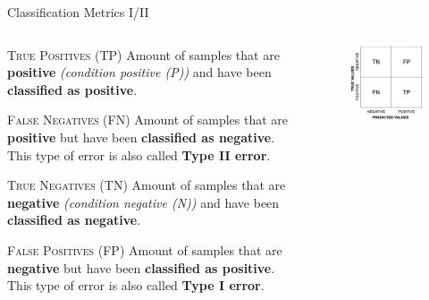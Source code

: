 \documentclass[document.tex]{subfiles}
\begin{document}
    \begin{frame}{Classification Metrics I/II}
        \begin{columns}
            \begin{column}{0.6\textwidth}
                \begin{alertblock}{\textsc{True Positives (TP)}}
                    Amount of samples that are \textbf{positive} \textit{(condition positive (P))} and have been \textbf{classified as positive}.
                \end{alertblock}
                \begin{alertblock}{\textsc{False Negatives (FN)}}
                    Amount of samples that are \textbf{positive} but have been \textbf{classified as negative}. This type of error is also called \textbf{Type II error}.
                \end{alertblock}
                \begin{alertblock}{\textsc{True Negatives (TN)}}
                    Amount of samples that are \textbf{negative} \textit{(condition negative (N))} and have been \textbf{classified as negative}.
                \end{alertblock}
                \begin{alertblock}{\textsc{False Positives (FP)}}
                    Amount of samples that are \textbf{negative} but have been \textbf{classified as positive}. This type of error is also called \textbf{Type I error}.
                \end{alertblock}
            \end{column}
            \begin{column}{0.4\textwidth}
                \begin{figure}
                    \label{fig:confusion-matrix}
                    \includegraphics[height=0.8\textwidth, keepaspectratio]{figures/drawio/confusion-matrix.png}
                \end{figure}
            \end{column}
        \end{columns}
    \end{frame}
\end{document}
